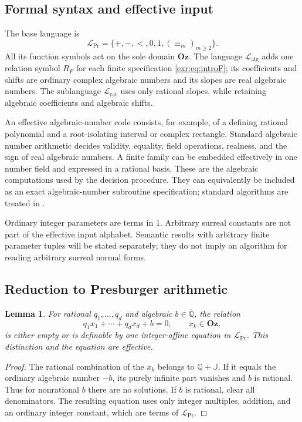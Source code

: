 \documentclass[11pt,letterpaper]{article}
\numberwithin{equation}{section}
\newtheorem{lemma}[lemma]{Lemma}
\theoremstyle{definition}
\theoremstyle{remark}
\newcommand{\Oz}{\mathbf{Oz}}
\newcommand{\Q}{\mathbb Q}
\newcommand{\Qb}{\overline{\mathbb Q}}
\newcommand{\J}{\mathbb J}
\newcommand{\Lrat}{\mathcal L_{\mathrm{rat}}}
\newcommand{\Lalg}{\mathcal L_{\mathrm{alg}}}
\newcommand{\LPr}{\mathcal L_{\mathrm{Pr}}}
\begin{document}
\subsection{Formal syntax and effective input}
The base language is
\begin{equation}
 \LPr=\{+,-,<,0,1,(\equiv_m)_{m\geq2}\}.
\end{equation}
All its function symbols act on the sole domain $\Oz$. The language $\Lalg$
adds one relation symbol $R_F$ for each finite specification
\eqref{exr:eq:introF}; its coefficients and shifts are ordinary complex algebraic
numbers and its slopes are real algebraic numbers. The sublanguage $\Lrat$ uses
only rational slopes, while retaining algebraic coefficients and algebraic shifts.

An effective algebraic-number code consists, for example, of a defining rational
polynomial and a root-isolating interval or complex rectangle. Standard algebraic
number arithmetic decides validity, equality, field operations, realness, and the
sign of real algebraic numbers. A finite family can be embedded effectively in one
number field and expressed in a rational basis. These are the algebraic
computations used by the decision procedure. They can equivalently be included as
an exact algebraic-number subroutine specification; standard algorithms are treated in \cite{cohen}.

Ordinary integer parameters are terms in $1$. Arbitrary surreal constants are not
part of the effective input alphabet. Semantic results with arbitrary finite
parameter tuples will be stated separately; they do not imply an algorithm for
reading arbitrary surreal normal forms.

\subsection{Reduction to Presburger arithmetic}
\begin{lemma}\label{exr:lem:rationalaffine}
For rational $q_1,\ldots,q_d$ and algebraic $b\in\Qb$, the relation
\begin{equation}
 q_1x_1+\cdots+q_dx_d+b=0,\qquad x_k\in\Oz,
\end{equation}
is either empty or is definable by one integer-affine equation in $\LPr$.
This distinction and the equation are effective.
\end{lemma}
\begin{proof}
The rational combination of the $x_k$ belongs to $\Q+\J$. If it equals the
ordinary algebraic number $-b$, its purely infinite part vanishes and $b$ is
rational. Thus for nonrational $b$ there are no solutions. If $b$ is rational,
clear all denominators. The resulting equation uses only integer multiples,
addition, and an ordinary integer constant, which are terms of $\LPr$.
\end{proof}
\end{document}
